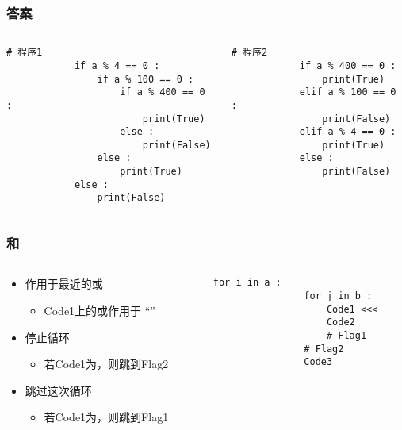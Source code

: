 \begin{CJK}{UTF8}{gbsn}
\begin{frame} [fragile]
	\frametitle{答案}
	\linespread{1.25}
	\begin{columns}[T]
		\begin{column}[T]{.5\textwidth}
			\begin{lstlisting}[style=pythonstyle, tabsize=2, gobble=6, texcl]
			# 程序1
			if a % 4 == 0 :
				if a % 100 == 0 :
					if a % 400 == 0 :
						print(True)
					else :
						print(False)
				else :
					print(True)
			else :
				print(False)
			\end{lstlisting}
		\end{column}
		\begin{column}[T]{.47\textwidth}
			\begin{lstlisting}[style=pythonstyle, tabsize=2, gobble=6, texcl]
			# 程序2
			if a % 400 == 0 :
				print(True)
			elif a % 100 == 0 :
				print(False)
			elif a % 4 == 0 :
				print(True)
			else :
				print(False)
			\end{lstlisting}
		\end{column}
	\end{columns}
\end{frame}

\begin{frame} [fragile]
	\frametitle{和}
	\linespread{1.25}
	\begin{columns}[T]
		\begin{column}[T]{.52\textwidth}
			\begin{itemize}
			\item 作用于最近的或
				\begin{itemize}
				\item Code1上的或作用于
						``''
				\end{itemize}
			\item {}停止循环
				\begin{itemize}
				\item 若Code1为，则跳到Flag2
				\end{itemize}
			\item {}跳过这次循环
				\begin{itemize}
				\item 若Code1为，则跳到Flag1
				\end{itemize}
			\end{itemize}
		\end{column}
		\begin{column}[T]{.48\textwidth}
			\begin{lstlisting}[style=pythonstyle, gobble=12]
			for i in a :
				for j in b :
					Code1 <<<
					Code2
					# Flag1
				# Flag2
				Code3
			\end{lstlisting}
		\end{column}
	\end{columns}
\end{frame}


\end{CJK}
